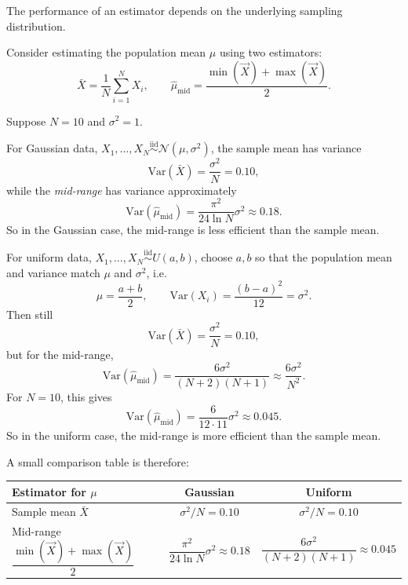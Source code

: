 \documentclass[11pt, titlepage]{article} %
\numberwithin{equation}{section}
\theoremstyle{definition}
\numberwithin{assumption}{section}
\begin{document}
The performance of an estimator depends on the underlying sampling distribution.

Consider estimating the population mean $\mu$ using two estimators:
\begin{equation*}
    \bar X=\frac{1}{N}\sum_{i=1}^N X_i,
    \qquad
    \hat{\mu}_{\mathrm{mid}}=\frac{\min(\vec X)+\max(\vec X)}{2}.
\end{equation*}

Suppose $N=10$ and $\sigma^2=1$.

For Gaussian data, $X_1,\dots,X_N \overset{\mathrm{iid}}{\sim} \mathcal{N}(\mu,\sigma^2)$, the sample mean has variance
\begin{equation*}
    \mathrm{Var}(\bar X)=\frac{\sigma^2}{N}=0.10,
\end{equation*}
while the \textit{mid-range} has variance approximately
\begin{equation*}
    \mathrm{Var}(\hat{\mu}_{\mathrm{mid}})
    =\frac{\pi^2}{24\ln N}\sigma^2
    \approx 0.18.
\end{equation*}
So in the Gaussian case, the mid-range is less efficient than the sample mean.

For uniform data, $X_1,\dots,X_N \overset{\mathrm{iid}}{\sim} U(a,b)$, choose $a,b$ so that the population mean and variance match $\mu$ and $\sigma^2$, i.e.
\begin{equation*}
    \mu=\frac{a+b}{2},
    \qquad
    \mathrm{Var}(X_i)=\frac{(b-a)^2}{12}=\sigma^2.
\end{equation*}
Then still
\begin{equation*}
    \mathrm{Var}(\bar X)=\frac{\sigma^2}{N}=0.10,
\end{equation*}
but for the mid-range,
\begin{equation*}
    \mathrm{Var}(\hat{\mu}_{\mathrm{mid}})
    =\frac{6\sigma^2}{(N+2)(N+1)}
    \approx \frac{6\sigma^2}{N^2}.
\end{equation*}
For $N=10$, this gives
\begin{equation*}
    \mathrm{Var}(\hat{\mu}_{\mathrm{mid}})
    =\frac{6}{12\cdot 11}\sigma^2
    \approx 0.045.
\end{equation*}
So in the uniform case, the mid-range is more efficient than the sample mean.

\medskip

A small comparison table is therefore:

\begin{center}
\begin{tabular}{lcc}
\hline
{Estimator for $\mu$} & {Gaussian} & {Uniform} \\
\hline
Sample mean $\bar X$ & $\sigma^2/N=0.10$ & $\sigma^2/N=0.10$ \\
Mid-range $\dfrac{\min(\vec X)+\max(\vec X)}{2}$ 
& $\dfrac{\pi^2}{24\ln N}\sigma^2\approx 0.18$
& $\dfrac{6\sigma^2}{(N+2)(N+1)}\approx 0.045$ \\
\hline
\end{tabular}
\end{center}
\end{document}
